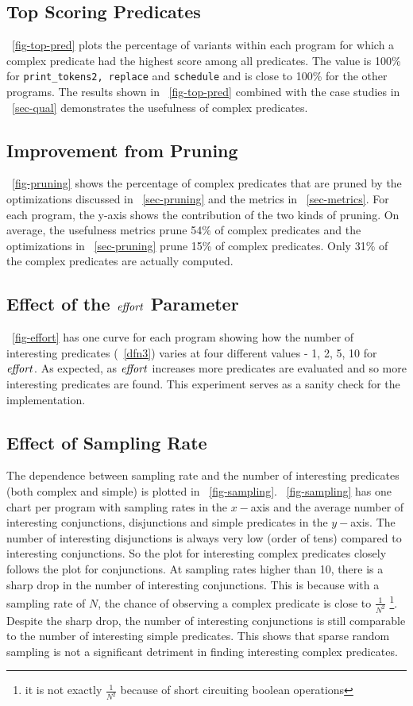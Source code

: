 \subsection{Top Scoring Predicates}
~\autoref{fig-top-pred} plots the percentage of variants within each program for which a complex predicate had the highest score among all predicates.  The value is 100\% for \texttt{print\_tokens2, replace} and \texttt{schedule} and is close to 100\% for the other programs.  The results shown in ~\autoref{fig-top-pred} combined with the case studies in ~\autoref{sec-qual} demonstrates the usefulness of complex predicates.

\subsection{Improvement from Pruning}
~\autoref{fig-pruning} shows the percentage of complex predicates that are pruned by the optimizations discussed in ~\autoref{sec-pruning} and the metrics in ~\autoref{sec-metrics}.  For each program, the y-axis shows the contribution of the two kinds of pruning.  On average, the usefulness metrics prune 54\% of complex predicates and the optimizations in ~\autoref{sec-pruning} prune 15\% of complex predicates.  Only 31\% of the complex predicates are actually computed.

\subsection{Effect of the $\mathit{effort}$ Parameter}
~\autoref{fig-effort} has one curve for each program showing how the number of interesting predicates (~\autoref{dfn3}) varies at four different values - 1, 2, 5, 10 for $\mathit{effort}$.  As expected, as $\mathit{effort}$ increases more predicates are evaluated and so more interesting predicates are found.  This experiment serves as a sanity check for the implementation.

\subsection{Effect of Sampling Rate}
\label{sec-sampling}
The dependence between sampling rate and the number of interesting predicates (both complex and simple) is plotted in ~\autoref{fig-sampling}.  ~\autoref{fig-sampling} has one chart per program with sampling rates in the $x-$axis and the average number of interesting conjunctions, disjunctions and simple predicates in the $y-$axis.  The number of interesting disjunctions is always very low (order of tens) compared to interesting conjunctions.  So the plot for interesting complex predicates closely follows the plot for conjunctions.  At sampling rates higher than 10, there is a sharp drop in the number of interesting conjunctions.  This is because with a sampling rate of $N$, the chance of observing a complex predicate is close to $\frac{1}{N^2}$ {\footnote{it is not exactly $\frac{1}{N^2}$ because of short circuiting boolean operations}}.  Despite the sharp drop, the number of interesting conjunctions is still comparable to the number of interesting simple predicates.  This shows that sparse random sampling is not a significant detriment in finding interesting complex predicates.

